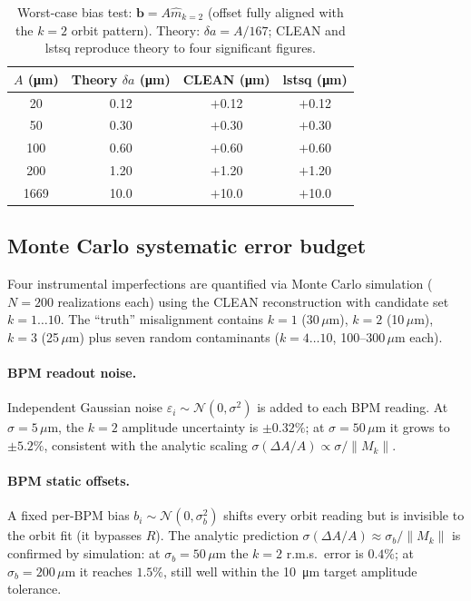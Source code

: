 \documentclass[preprint,12pt]{elsarticle}
\begin{document}
\begin{table}[t]
\centering
\caption{Worst-case bias test: $\mathbf{b}=A\hat{m}_{k=2}$
(offset fully aligned with the $k=2$ orbit pattern).
Theory: $\delta a=A/167$; CLEAN and lstsq reproduce theory to
four significant figures.}
\label{tab:whiteness}
\begin{tabular}{cccc}
\toprule
$A$ (\si{\micro\meter}) & Theory $\delta a$ (\si{\micro\meter}) &
CLEAN (\si{\micro\meter}) & lstsq (\si{\micro\meter}) \\
\midrule
  20 & 0.12 & $+$0.12 & $+$0.12 \\
  50 & 0.30 & $+$0.30 & $+$0.30 \\
 100 & 0.60 & $+$0.60 & $+$0.60 \\
 200 & 1.20 & $+$1.20 & $+$1.20 \\
1669 & 10.0 & $+$10.0 & $+$10.0 \\
\bottomrule
\end{tabular}
\end{table}

\subsection{Monte Carlo systematic error budget}
\label{sec:systematics}

Four instrumental imperfections are quantified via Monte Carlo simulation
($N=200$ realizations each) using the CLEAN reconstruction with candidate set
$k=1\ldots10$.  The ``truth'' misalignment contains $k=1$ (30\,$\mu$m),
$k=2$ (10\,$\mu$m), $k=3$ (25\,$\mu$m) plus seven random contaminants
($k=4\ldots10$, 100--300\,$\mu$m each).

\paragraph{BPM readout noise.}
Independent Gaussian noise $\varepsilon_i\sim\mathcal{N}(0,\sigma^2)$ is
added to each BPM reading.  At $\sigma=5\,\mu$m, the $k=2$ amplitude
uncertainty is $\pm0.32\%$; at $\sigma=50\,\mu$m it grows to $\pm5.2\%$,
consistent with the analytic scaling $\sigma(\Delta A/A)\propto\sigma/\|M_k\|$.

\paragraph{BPM static offsets.}
A fixed per-BPM bias $b_i\sim\mathcal{N}(0,\sigma_b^2)$ shifts every orbit
reading but is invisible to the orbit fit (it bypasses $R$).  The analytic
prediction $\sigma(\Delta A/A)\approx\sigma_b/\|M_k\|$ is confirmed by
simulation: at $\sigma_b=50\,\mu$m the $k=2$ r.m.s.\ error is $0.4\%$;
at $\sigma_b=200\,\mu$m it reaches $1.5\%$, still well within the
\SI{10}{\micro\meter} target amplitude tolerance.
\end{document}
